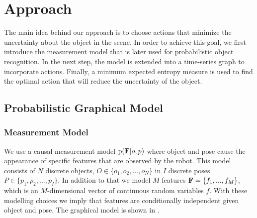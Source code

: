 \section{Approach}

The main idea behind our approach is to choose actions that minimize the uncertainty about the object in the scene. In order to achieve this goal, we first introduce the measurement model that is later used for probabilistic object recognition. In the next step, the model is extended into a time-series graph to incorporate actions. Finally, a minimum expected entropy measure is used to find the optimal action that will reduce the uncertainty of the object.

    \subsection{Probabilistic Graphical Model}
            
        \subsubsection{Measurement Model}
            We use a causal measurement model $\text{p}(\mathbf{F}|o,p)$ where object and pose cause the appearance of specific features that are observed by the robot. This model consists of $N$ discrete objects, $O \in \{o_1,o_2, ..., o_N\}$ in $I$ discrete poses $P \in \{p_1,p_2, ..., p_I\}$. In addition to that we model $M$ features $\mathbf{F} = \left\{ f_1, ...,  f_M\right\}$, which is an $M$-dimensional vector of continuous random variables $f$. With these modelling choices we imply that features are conditionally independent given object and pose. The graphical model is shown in .

